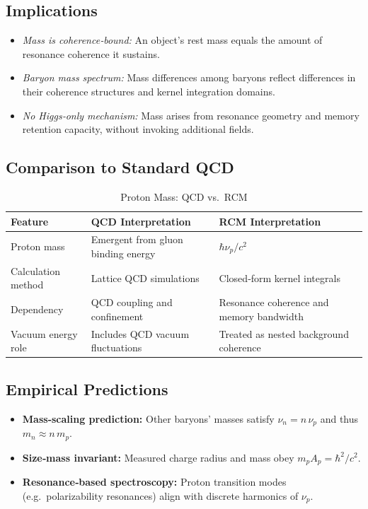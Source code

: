 \subsection{Implications}
\begin{itemize}
  \item \emph{Mass is coherence‐bound:} An object’s rest mass equals the amount of resonance coherence it sustains.  
  \item \emph{Baryon mass spectrum:} Mass differences among baryons reflect differences in their coherence structures and kernel integration domains.  
  \item \emph{No Higgs‐only mechanism:} Mass arises from resonance geometry and memory retention capacity, without invoking additional fields.
\end{itemize}

\subsection{Comparison to Standard QCD}
\begin{table}[ht]
  \centering
  \caption{Proton Mass: QCD vs.\ RCM}
  \label{tab:mass_comparison}
  \begin{tabular}{@{}lll@{}}
    \toprule
    Feature              & QCD Interpretation                        & RCM Interpretation \\
    \midrule
    Proton mass          & Emergent from gluon binding energy        & \(\hbar\nu_p/c^2\) \\
    Calculation method   & Lattice QCD simulations                   & Closed‐form kernel integrals \\
    Dependency           & QCD coupling and confinement              & Resonance coherence and memory bandwidth \\
    Vacuum energy role   & Includes QCD vacuum fluctuations          & Treated as nested background coherence \\
    \bottomrule
  \end{tabular}
\end{table}

\subsection{Empirical Predictions}
\begin{itemize}
  \item \textbf{Mass‐scaling prediction:} Other baryons’ masses satisfy \(\nu_n = n\,\nu_p\) and thus \(m_n \approx n\,m_p\).  
  \item \textbf{Size‐mass invariant:} Measured charge radius and mass obey \(m_p A_p = \hbar^2/c^2\).  
  \item \textbf{Resonance‐based spectroscopy:} Proton transition modes (e.g.\ polarizability resonances) align with discrete harmonics of \(\nu_p\).
\end{itemize}

